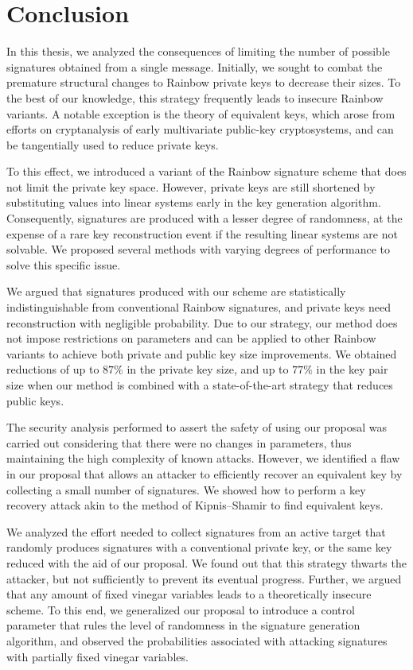 \documentclass[12pt, a4paper, oneside]{memoir}
\theoremstyle{definition}
\begin{document}
\chapter{Conclusion}\label{ch:conc}

In this thesis, we analyzed the consequences of limiting the number of possible signatures obtained from a single message. Initially, we sought to combat the premature structural changes to Rainbow private keys to decrease their sizes. To the best of our knowledge, this strategy frequently leads to insecure Rainbow variants. A notable exception is the theory of equivalent keys, which arose from efforts on cryptanalysis of early multivariate public-key cryptosystems, and can be tangentially used to reduce private keys.

To this effect, we introduced a variant of the Rainbow signature scheme that does not limit the private key space. However, private keys are still shortened by substituting values into linear systems early in the key generation algorithm. Consequently, signatures are produced with a lesser degree of randomness, at the expense of a rare key reconstruction event if the resulting linear systems are not solvable. We proposed several methods with varying degrees of performance to solve this specific issue.

We argued that signatures produced with our scheme are statistically indistinguishable from conventional Rainbow signatures, and private keys need reconstruction with negligible probability. Due to our strategy, our method does not impose restrictions on parameters and can be applied to other Rainbow variants to achieve both private and public key size improvements. We obtained reductions of up to $87\%$ in the private key size, and up to $77\%$ in the key pair size when our method is combined with a state-of-the-art strategy that reduces public keys.

The security analysis performed to assert the safety of using our proposal was carried out considering that there were no changes in parameters, thus maintaining the high complexity of known attacks. However, we identified a flaw in our proposal that allows an attacker to efficiently recover an equivalent key by collecting a small number of signatures. We showed how to perform a key recovery attack akin to the method of Kipnis--Shamir to find equivalent keys.

We analyzed the effort needed to collect signatures from an active target that randomly produces signatures with a conventional private key, or the same key reduced with the aid of our proposal. We found out that this strategy thwarts the attacker, but not sufficiently to prevent its eventual progress. Further, we argued that any amount of fixed vinegar variables leads to a theoretically insecure scheme. To this end, we generalized our proposal to introduce a control parameter that rules the level of randomness in the signature generation algorithm, and observed the probabilities associated with attacking signatures with partially fixed vinegar variables.
\end{document}
